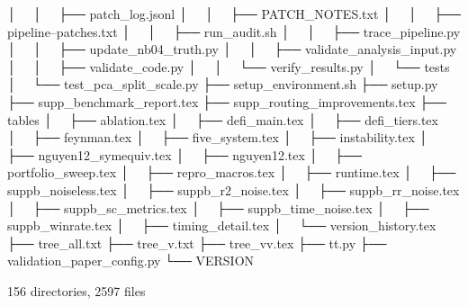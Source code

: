│   │   ├── patch_log.jsonl
│   │   ├── PATCH_NOTES.txt
│   │   ├── pipeline--patches.txt
│   │   ├── run_audit.sh
│   │   ├── trace_pipeline.py
│   │   ├── update_nb04_truth.py
│   │   ├── validate_analysis_input.py
│   │   ├── validate_code.py
│   │   └── verify_results.py
│   └── tests
│       └── test_pca_split_scale.py
├── setup_environment.sh
├── setup.py
├── supp_benchmark_report.tex
├── supp_routing_improvements.tex
├── tables
│   ├── ablation.tex
│   ├── defi_main.tex
│   ├── defi_tiers.tex
│   ├── feynman.tex
│   ├── five_system.tex
│   ├── instability.tex
│   ├── nguyen12_symequiv.tex
│   ├── nguyen12.tex
│   ├── portfolio_sweep.tex
│   ├── repro_macros.tex
│   ├── runtime.tex
│   ├── suppb_noiseless.tex
│   ├── suppb_r2_noise.tex
│   ├── suppb_rr_noise.tex
│   ├── suppb_sc_metrics.tex
│   ├── suppb_time_noise.tex
│   ├── suppb_winrate.tex
│   ├── timing_detail.tex
│   └── version_history.tex
├── tree_all.txt
├── tree_v.txt
├── tree_vv.tex
├── tt.py
├── validation_paper_config.py
└── VERSION

156 directories, 2597 files
